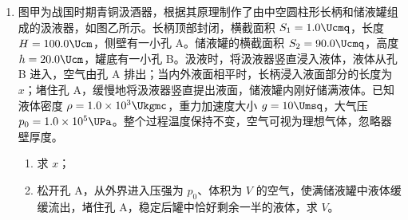 \documentclass[\gkver]{gaokaozhenti}
\begin{document}
\begin{enumerate}
{所以光线在 EF 上的入射点 D 到 E 点的距离范围为 $0 < x \le \frac{2\sqrt{3}}{9}R$。
}

\item
图甲为战国时期青铜汲酒器，根据其原理制作了由中空圆柱形长柄和储液罐组成的汲液器，如图乙所示。长柄顶部封闭，横截面积 $S_{1} = 1.0 \Ucmq$，长度 $H = 100.0 \Ucm$，侧壁有一小孔 A。储液罐的横截面积 $S_{2} = 90.0 \Ucmq$，高度 $h = 20.0 \Ucm$，罐底有一小孔 B。汲液时，将汲液器竖直浸入液体，液体从孔 B 进入，空气由孔 A 排出；当内外液面相平时，长柄浸入液面部分的长度为 $x$；堵住孔 A，缓慢地将汲液器竖直提出液面，储液罐内刚好储满液体。已知液体密度 $\rho = 1.0 \times 10^{3} \Ukgmc$，重力加速度大小 $g = 10 \Umsq$，大气压 $p_{0} = 1.0 \times 10^{5} \UPa$。整个过程温度保持不变，空气可视为理想气体，忽略器壁厚度。
\begin{enumerate}
	\item
	求 $x$；
	\item
	松开孔 A，从外界进入压强为 $p_{0}$、体积为 $V$ 的空气，使满储液罐中液体缓缓流出，堵住孔 A，稳定后罐中恰好剩余一半的液体，求 $V$。
\end{enumerate}


\end{enumerate}
\end{document}
